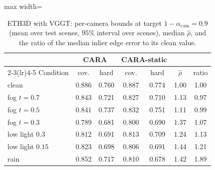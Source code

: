\begin{table}[!htbp]\centering\footnotesize
\caption{ETH3D with VGGT: per-camera bounds at target $1-\alpha_{\mathrm{cam}}=0.9$ (mean over test scenes, 95\% interval over scenes), median $\hat\rho$, and the ratio of the median inlier edge error to its clean value.}\label{tab:eth3dbounds}
\setlength{\tabcolsep}{2.5pt}\begin{adjustbox}{max width=\textwidth}\begin{tabular}{lcccccc}\toprule
 & \multicolumn{2}{c}{CARA} & \multicolumn{2}{c}{CARA-static} & & \\\cmidrule(lr){2-3}\cmidrule(lr){4-5}
Condition & cov. & hard & cov. & hard & $\hat\rho$ & ratio \\\midrule
clean & 0.886 & 0.760 & 0.887 & 0.774 & 1.00 & 1.00 \\
fog $t{=}0.7$ & 0.843 & 0.721 & 0.827 & 0.710 & 1.13 & 0.97 \\
fog $t{=}0.5$ & 0.841 & 0.737 & 0.832 & 0.751 & 1.11 & 0.99 \\
fog $t{=}0.3$ & 0.789 & 0.681 & 0.800 & 0.690 & 1.37 & 1.07 \\
low light $0.3$ & 0.812 & 0.691 & 0.813 & 0.709 & 1.24 & 1.13 \\
low light $0.15$ & 0.823 & 0.698 & 0.806 & 0.691 & 1.44 & 1.21 \\
rain & 0.852 & 0.717 & 0.810 & 0.678 & 1.42 & 1.89 \\
\bottomrule\end{tabular}\end{adjustbox}\end{table}
